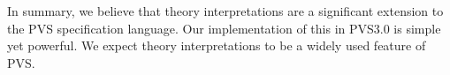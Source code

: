 \documentclass[11pt,twoside,openright,titlepage]{cslreport}
\begin{document}
In summary, we believe that theory interpretations are a significant
extension to the PVS specification language.  Our implementation of this
in PVS3.0 is simple yet powerful.  We expect theory interpretations to be
a widely used feature of PVS.

\newpage


\end{document}
